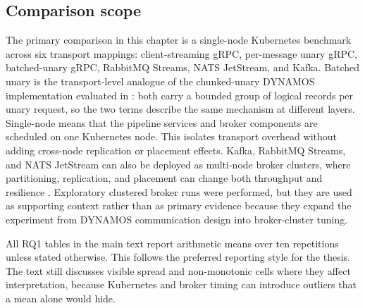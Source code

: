 \subsection{Comparison scope}

The primary comparison in this chapter is a single-node Kubernetes benchmark across six transport mappings: client-streaming gRPC, per-message unary gRPC, batched-unary gRPC, RabbitMQ Streams, NATS JetStream, and Kafka. Batched unary is the transport-level analogue of the chunked-unary DYNAMOS implementation evaluated in : both carry a bounded group of logical records per unary request, so the two terms describe the same mechanism at different layers. Single-node means that the pipeline services and broker components are scheduled on one Kubernetes node. This isolates transport overhead without adding cross-node replication or placement effects. Kafka, RabbitMQ Streams, and NATS JetStream can also be deployed as multi-node broker clusters, where partitioning, replication, and placement can change both throughput and resilience \cite{kafka2026official,rabbitmq2026streams,nats2026jetstream,nuikka2021cloudnative}. Exploratory clustered broker runs were performed, but they are used as supporting context rather than as primary evidence because they expand the experiment from DYNAMOS communication design into broker-cluster tuning.

All RQ1 tables in the main text report arithmetic means over ten repetitions unless stated otherwise. This follows the preferred reporting style for the thesis. The text still discusses visible spread and non-monotonic cells where they affect interpretation, because Kubernetes and broker timing can introduce outliers that a mean alone would hide.

\begin{table}[!htbp]
    \centering
    \footnotesize
    \caption{Single-node synthetic-clean summary across six transports, averaged over ten repetitions, four payload sizes, and four concurrency levels.}
    \label{tab:grpc-preliminary-results}
\end{table}

